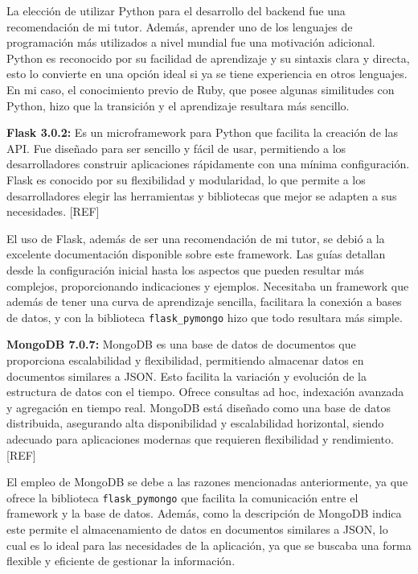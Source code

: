 La elección de utilizar Python para el desarrollo del backend fue una recomendación de mi tutor. Además, aprender uno de los lenguajes de programación más utilizados a nivel mundial fue una motivación adicional. Python es reconocido por su facilidad de aprendizaje y su sintaxis clara y directa, esto lo convierte en una opción ideal si ya se tiene experiencia en otros lenguajes. En mi caso, el conocimiento previo de Ruby, que posee algunas similitudes con Python, hizo que la transición  y el aprendizaje resultara más sencillo.

\textbf{Flask 3.0.2:} Es un microframework para Python que facilita la creación de las API. Fue diseñado para ser sencillo y fácil de usar, permitiendo a los desarrolladores construir aplicaciones rápidamente con una mínima configuración. Flask es conocido por su flexibilidad y modularidad, lo que permite a los desarrolladores elegir las herramientas y bibliotecas que mejor se adapten a sus necesidades. [REF]

El uso de Flask, además de ser una recomendación de mi tutor, se debió a la excelente documentación disponible sobre este framework. Las guías detallan desde la configuración inicial hasta los aspectos que pueden resultar más complejos, proporcionando indicaciones y ejemplos. Necesitaba un framework que además de tener una curva de aprendizaje sencilla, facilitara la conexión a bases de datos, y con la biblioteca \texttt{flask\_pymongo} hizo que todo resultara más simple.


\textbf{MongoDB 7.0.7:} MongoDB es una base de datos de documentos que proporciona escalabilidad y flexibilidad, permitiendo almacenar datos en documentos similares a JSON. Esto facilita la variación y evolución de la estructura de datos con el tiempo. Ofrece consultas ad hoc, indexación avanzada y agregación en tiempo real. MongoDB está diseñado como una base de datos distribuida, asegurando alta disponibilidad y escalabilidad horizontal, siendo adecuado para aplicaciones modernas que requieren flexibilidad y rendimiento. [REF]

El empleo de MongoDB se debe a las razones mencionadas anteriormente, ya que ofrece la biblioteca \texttt{flask\_pymongo} que facilita la comunicación entre el framework y la base de datos. Además, como la descripción de MongoDB indica este permite el almacenamiento de datos en documentos similares a JSON, lo cual es lo ideal para las necesidades de la aplicación, ya que se buscaba una forma flexible y eficiente de gestionar la información. 

